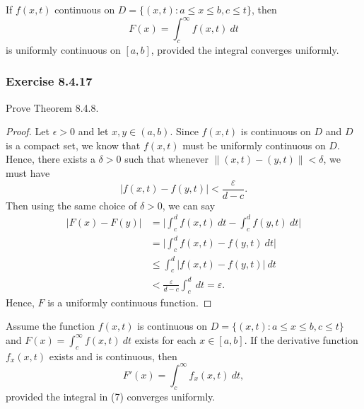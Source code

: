 \begin{theorem}{}{}
    If \( f(x,t)  \) continuous on \( D = \{ (x,t) : a \leq x \leq b , c \leq t  \}  \), then 
    \[  F(x) = \int_{ c }^{ \infty  } f(x,t) \ dt \] is uniformly continuous on \( [a,b]  \), provided the integral converges uniformly.
\end{theorem}

\subsubsection{Exercise 8.4.17} Prove Theorem 8.4.8.
\begin{proof}
Let \( \epsilon > 0  \) and let \( x, y \in (a,b)  \). Since \( f(x,t)  \) is continuous on \( D  \) and \( D  \) is a compact set, we know that \( f(x,t)  \) must be uniformly continuous on \( D  \). Hence, there exists a \( \delta > 0  \) such that whenever \( \lVert (x,t) - (y,t) \rVert < \delta  \), we must have 
\[  | f(x,t) - f(y,t)  | < \frac{ \varepsilon }{  d -c  }. \] 
Then using the same choice of \( \delta > 0  \), we can say
\begin{align*}
   | F(x) - F(y)  |  &= \Big| \int_{ c }^{ d } f(x,t) \ dt - \int_{ c }^{ d } f(y,t) \ dt    \Big|  \\
                     &= \Big| \int_{ c }^{ d } f(x,t)  - f(y,t) \ dt  \Big| \\
                     &\leq \int_{ c }^{ d }  | f(x,t) - f(y,t)  | \  dt \\
                     &< \frac{ \varepsilon }{ d - c  } \int_{ c }^{ d }  \ dt = \varepsilon.
\end{align*}
Hence, \( F  \) is a uniformly continuous function.
\end{proof}

\begin{theorem}{}{}
    Assume the function \( f(x,t)  \) is continuous on \( D = \{ (x,t) : a \leq x \leq b , c \leq t  \}  \) and \( F(x) = \int_{ c }^{ \infty  } f(x,t) \ dt  \) exists for each  \(  x \in [a,b]  \). If the derivative function \( f_{x}(x,t)  \) exists and is continuous, then 
    \[  F'(x) = \int_{ c  }^{ \infty  }  f_{x}(x,t) \ dt, \]
    provided the integral in (7) converges uniformly.
\end{theorem}

